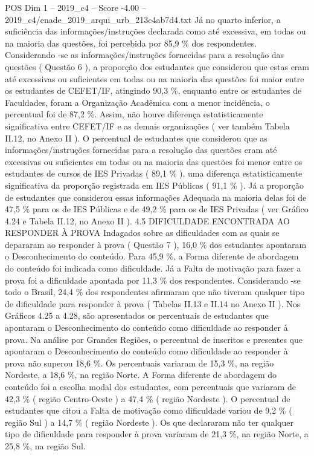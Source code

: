 \begin{textsample}{POS Dim 1 – 2019\_c4 – Score -4.00 – 2019\_c4/enade\_2019\_arqui\_urb\_213c4ab7d4.txt}
Já no quarto inferior, a suficiência das informações/instruções declarada como até excessiva, em todas ou na maioria das questões, foi percebida por 85,9 \% dos respondentes.
Considerando -se as informações/instruções fornecidas para a resolução das questões ( Questão 6 ), a proporção dos estudantes que considerou que estas eram até excessivas ou suficientes em todas ou na maioria das questões foi maior entre os estudantes de CEFET/IF, atingindo 90,3 \%, enquanto entre os estudantes de Faculdades, foram a Organização Acadêmica com a menor incidência, o percentual foi de 87,2 \%.
Assim, não houve diferença estatisticamente significativa entre CEFET/IF e as demais organizações ( ver também Tabela II.12, no Anexo II ).
O percentual de estudantes que considerou que as informações/instruções fornecidas para a resolução das questões eram até excessivas ou suficientes em todas ou na maioria das questões foi menor entre os estudantes de cursos de IES Privadas ( 89,1 \% ), uma diferença estatisticamente significativa da proporção registrada em IES Públicas ( 91,1 \% ).
Já a proporção de estudantes que considerou essas informações Adequada na maioria delas foi de 47,5 \% para os de IES Públicas e de 49,2 \% para os de IES Privadas ( ver Gráfico 4.24 e Tabela II.12, no Anexo II ). 4.5 DIFICULDADE ENCONTRADA AO RESPONDER À PROVA Indagados sobre as dificuldades com as quais se depararam ao responder à prova ( Questão 7 ), 16,0 \% dos estudantes apontaram o Desconhecimento do conteúdo.
Para 45,9 \%, a Forma diferente de abordagem do conteúdo foi indicada como dificuldade.
Já a Falta de motivação para fazer a prova foi a dificuldade apontada por 11,3 \% dos respondentes.
Considerando -se todo o Brasil, 24,4 \% dos respondentes afirmaram que não tiveram qualquer tipo de dificuldade para responder à prova ( Tabelas II.13 e II.14 no Anexo II ).
Nos Gráficos 4.25 a 4.28, são apresentados os percentuais de estudantes que apontaram o Desconhecimento do conteúdo como dificuldade ao responder à prova.
Na análise por Grandes Regiões, o percentual de inscritos e presentes que apontaram o Desconhecimento do conteúdo como dificuldade ao responder à prova não superou 18,6 \%.
Os percentuais variaram de 15,3 \%, na região Nordeste, a 18,6 \%, na região Norte.
A Forma diferente de abordagem do conteúdo foi a escolha modal dos estudantes, com percentuais que variaram de 42,3 \% ( região Centro-Oeste ) a 47,4 \% ( região Nordeste ).
O percentual de estudantes que citou a Falta de motivação como dificuldade variou de 9,2 \% ( região Sul ) a 14,7 \% ( região Nordeste ).
Os que declararam não ter qualquer tipo de dificuldade para responder à prova variaram de 21,3 \%, na região Norte, a 25,8 \%, na região Sul.

\end{textsample}
